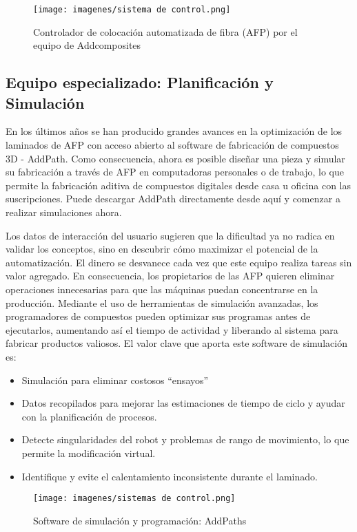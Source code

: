 \begin{enumerate}[label=\arabic*.]
\begin{figure}[h]
    \centering
    \texttt{[image: imagenes/sistema de control.png]}
    \caption{Controlador de colocación automatizada de fibra (AFP) por el equipo de Addcomposites}
    \label{fig:enter-label}
\end{figure}


\subsection{Equipo especializado: Planificación y Simulación}

En los últimos años se han producido grandes avances en la optimización de los laminados de AFP con acceso abierto al software de fabricación de compuestos 3D - AddPath. Como consecuencia, ahora es posible diseñar una pieza y simular su fabricación a través de AFP en computadoras personales o de trabajo, lo que permite la fabricación aditiva de compuestos digitales desde casa u oficina con las suscripciones. Puede descargar AddPath directamente desde aquí y comenzar a realizar simulaciones ahora.

Los datos de interacción del usuario sugieren que la dificultad ya no radica en validar los conceptos, sino en descubrir cómo maximizar el potencial de la automatización. El dinero se desvanece cada vez que este equipo realiza tareas sin valor agregado. En consecuencia, los propietarios de las AFP quieren eliminar operaciones innecesarias para que las máquinas puedan concentrarse en la producción. Mediante el uso de herramientas de simulación avanzadas, los programadores de compuestos pueden optimizar sus programas antes de ejecutarlos, aumentando así el tiempo de actividad y liberando al sistema para fabricar productos valiosos. El valor clave que aporta este software de simulación es:

\begin{itemize}
    \item Simulación para eliminar costosos “ensayos”
    \item Datos recopilados para mejorar las estimaciones de tiempo de ciclo y ayudar con la planificación de procesos.
    \item Detecte singularidades del robot y problemas de rango de movimiento, lo que permite la modificación virtual.
    \item Identifique y evite el calentamiento inconsistente durante el laminado.
\end{itemize}

\begin{figure}[h]
    \centering
    \texttt{[image: imagenes/sistemas de control.png]}
    \caption{Software de simulación y programación: AddPaths}
    \label{fig:enter-label}
\end{figure}



\end{enumerate}
